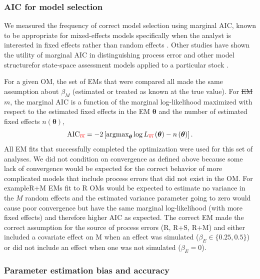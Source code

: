 \documentclass[
  12pt,
]{article}
\makeatletter
\providecommand{\DIFadd}[1]{{\protect\color{blue}\uwave{#1}}} %
\providecommand{\DIFdel}[1]{{\protect\color{red}\sout{#1}}} %
\providecommand{\DIFaddbegin}{} %
\providecommand{\DIFaddend}{} %
\providecommand{\DIFdelbegin}{} %
\providecommand{\DIFdelend}{} %
\providecommand{\DIFscaledelfig}{0.5}
\newlength{\DIFdelgraphicswidth} %
\newlength{\DIFdelgraphicsheight} %
\providecommand{\DIFaddincludegraphics}[2][]{{\color{blue}\fbox{\DIFOincludegraphics[#1]{#2}}}} %
\providecommand{\DIFdelincludegraphics}[2][]{%
\sbox{\DIFdelgraphicsbox}{\DIFOincludegraphics[#1]{#2}}%
\settoboxwidth{\DIFdelgraphicswidth}{\DIFdelgraphicsbox} %
\settoboxtotalheight{\DIFdelgraphicsheight}{\DIFdelgraphicsbox} %
\scalebox{\DIFscaledelfig}{%
\parbox[b]{\DIFdelgraphicswidth}{\usebox{\DIFdelgraphicsbox}\\[-\baselineskip] \rule{\DIFdelgraphicswidth}{0em}}\llap{\resizebox{\DIFdelgraphicswidth}{\DIFdelgraphicsheight}{%
\setlength{\unitlength}{\DIFdelgraphicswidth}%
\begin{picture}(1,1)%
\thicklines\linethickness{2pt} %
{\color[rgb]{1,0,0}\put(0,0){\framebox(1,1){}}}%
{\color[rgb]{1,0,0}\put(0,0){\line( 1,1){1}}}%
{\color[rgb]{1,0,0}\put(0,1){\line(1,-1){1}}}%
\end{picture}%
}\hspace*{3pt}}} %
} %
\DeclareRobustCommand{\DIFaddbegin}{\DIFOaddbegin \let\includegraphics\DIFaddincludegraphics} %
\DeclareRobustCommand{\DIFaddend}{\DIFOaddend \let\includegraphics\DIFOincludegraphics} %
\DeclareRobustCommand{\DIFdelbegin}{\DIFOdelbegin \let\includegraphics\DIFdelincludegraphics} %
\DeclareRobustCommand{\DIFdelend}{\DIFOaddend \let\includegraphics\DIFOincludegraphics} %
\let\sout@orig\sout %
\renewcommand{\sout}[1]{\ifmmode\text{\sout@orig{\ensuremath{#1}}}\else\sout@orig{#1}\fi} %
\makeatother
\begin{document}
\subsubsection*{AIC for model selection}\label{aic-for-model-selection}

We measured the frequency of correct model selection using marginal AIC,
known to be appropriate for mixed-effects models specifically when the
analyst is interested in fixed effects rather than random effects
\citep{vaidablanchard05}. Other studies have shown the utility of
marginal AIC in distinguishing process error and other model structure\DIFaddbegin \DIFadd{s}\DIFaddend  for state-space assessment models applied to a particular stock
\citep{millerhyun18, stockmiller21}.

For a given OM, the set of EMs that were compared all made the same
assumption about \(\beta_M\) (estimated or treated as known at the true
value). For \DIFdelbegin \DIFdel{EM \(m\)}\DIFdelend \DIFaddbegin \DIFadd{a given EM}\DIFaddend , the marginal AIC is a function of the marginal
log-likelihood maximized with respect to the estimated fixed effects
\DIFaddbegin \DIFadd{(\(\boldsymbol{\theta}\)) }\DIFaddend in the EM \DIFdelbegin \DIFdel{\(\boldsymbol{\theta}\) }\DIFdelend and the number of estimated fixed
effects \(n\left(\boldsymbol{\theta}\right)\), \[
\text{AIC} \DIFdelbegin \DIFdel{_m }\DIFdelend = -2\left[{\text{argmax}}_{\boldsymbol{\theta}} \log L\DIFdelbegin \DIFdel{_m}\DIFdelend \left({\boldsymbol{\theta}}\right) - n\left({\boldsymbol{\theta}}\right)\right].
\] All EM fits that successfully completed the optimization were used
for this set of analyses. We did not condition on convergence as defined
above because some lack of convergence would be expected for the correct
behavior of more complicated models that include process errors that did
not exist in the OM. For example\DIFaddbegin \DIFadd{, }\DIFaddend R+M EMs fit to R OMs would be expected
to estimate no variance in the \(M\) random effects and the estimated
variance parameter going to zero would cause poor convergence but have
the same marginal log-likelihood (with more fixed effects) and therefore
higher AIC as expected. The correct EM made the correct assumption for
the source of process errors (R, R+S, R+M) and either included a
covariate effect on M when an effect was simulated
(\(\beta_E \in \{0.25,0.5\}\)) or did not include an effect when one was
not simulated (\(\beta_E = 0\)).

\subsubsection*{Parameter estimation bias and
accuracy}\label{parameter-estimation-bias-and-accuracy}
\end{document}
